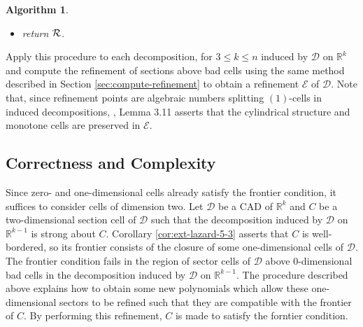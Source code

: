 \documentclass[
]{book}
\newtheorem{algorithm}{Algorithm}
\theoremstyle{definition}
\theoremstyle{definition}
\theoremstyle{definition}
\theoremstyle{definition}
\theoremstyle{remark}
\begin{document}
\begin{algorithm}
\begin{itemize}
\begin{itemize}
\begin{itemize}
      This may be done by computing a Groebner basis eliminating \(z\).
    \item
      Finally, to obtain refinement polynomials for \(D\), substitute
      \[
      L := \{ {\mathrm{sub}}_{\mathbf{b}}(f) \in \mathbb{Q}[x_k] \mid f \in S_1 \cup S_2 \}.
      \]
    \item
      Refinement points are the roots
      \[
      (c_1,\ldots,c_t)
      \]
      of polynomials in \(L\).
    \item
      Let
      \[
      {\cal R} := {\cal R} \cup \{ {\cal R}_{\mathbf{b}} = (c_1,\ldots,c_t) \}.
      \]
    \end{itemize}
  \end{itemize}
\item
  return \(\cal R\).
\end{itemize}

\end{algorithm}

Apply this procedure to each decomposition, for \(3 \le k \le n\) induced by \(\mathcal{D}\) on \(\mathbb{R}^k\) and compute the refinement of sections above bad cells using the same method described in Section \ref{sec:compute-refinement} to obtain a refinement \(\mathcal{E}\) of \(\mathcal{D}\). Note that, since refinement points are algebraic numbers splitting \((1)\)-cells in induced decompositions, \citet{bgv15}, Lemma 3.11 asserts that the cylindrical structure and monotone cells are preserved in \(\mathcal{E}\).

\hypertarget{correctness-and-complexity-2}{%
\subsection{Correctness and Complexity}\label{correctness-and-complexity-2}}

Since zero- and one-dimensional cells already satisfy the frontier condition, it suffices to consider cells of dimension two.
Let \(\mathcal{D}\) be a CAD of \(\mathbb{R}^k\) and \(C\) be a two-dimensional section cell of \(\mathcal{D}\) such that the decomposition induced by \(\mathcal{D}\) on \(\mathbb{R}^{k-1}\) is strong about \(C\). Corollary \ref{cor:ext-lazard-5-3} asserts that \(C\) is well-bordered, so its frontier consists of the closure of some one-dimensional cells of \(\mathcal{D}\). The frontier condition fails in the region of sector cells of \(\mathcal{D}\) above \(0\)-dimensional bad cells in the decomposition induced by \(\mathcal{D}\) on \(\mathbb{R}^{k-1}\).
The procedure described above explains how to obtain some new polynomials which allow these one-dimensional sectors to be refined such that they are compatible with the frontier of \(C\). By performing this refinement, \(C\) is made to satisfy the forntier condition.
\end{document}
